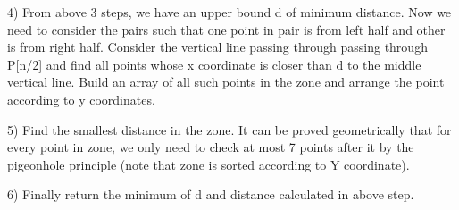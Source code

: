 \documentclass{article}
\begin{document}
4) From above 3 steps, we have an upper bound d of minimum distance. Now we need to consider the pairs such that one point in pair is from left half and other is from right half. Consider the vertical line passing through passing through P[n/2] and find all points whose x coordinate is closer than d to the middle vertical line. Build an array of all such points in the zone and arrange the point according to y coordinates.


5) Find the smallest distance in the zone. It can be proved geometrically that for every point in zone, we only need to check at most 7 points after it by the pigeonhole principle (note that zone is sorted according to Y coordinate).

6) Finally return the minimum of d and distance calculated in above step.
\end{document}
